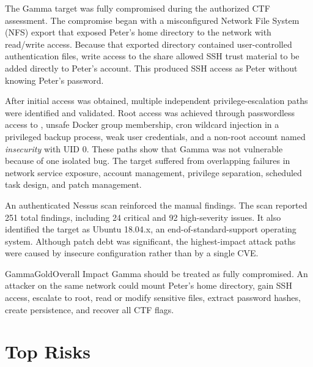 \documentclass[11pt,a4paper]{report}
\newcommand{\cmd}[1]{\texttt{\detokenize{#1}}}
\begin{document}
The Gamma target was fully compromised during the authorized CTF assessment. The compromise began with a misconfigured Network File System (NFS) export that exposed Peter's home directory to the network with read/write access. Because that exported directory contained user-controlled authentication files, write access to the share allowed SSH trust material to be added directly to Peter's account. This produced SSH access as Peter without knowing Peter's password.

After initial access was obtained, multiple independent privilege-escalation paths were identified and validated. Root access was achieved through passwordless \cmd{sudo} access to \cmd{/usr/bin/strace}, unsafe Docker group membership, cron wildcard injection in a privileged backup process, weak user credentials, and a non-root account named \textit{insecurity} with UID 0. These paths show that Gamma was not vulnerable because of one isolated bug. The target suffered from overlapping failures in network service exposure, account management, privilege separation, scheduled task design, and patch management.

An authenticated Nessus scan reinforced the manual findings. The scan reported 251 total findings, including 24 critical and 92 high-severity issues. It also identified the target as Ubuntu 18.04.x, an end-of-standard-support operating system. Although patch debt was significant, the highest-impact attack paths were caused by insecure configuration rather than by a single CVE.

\begin{findingbox}{GammaGold}{Overall Impact}
Gamma should be treated as fully compromised. An attacker on the same network could mount Peter's home directory, gain SSH access, escalate to root, read or modify sensitive files, extract password hashes, create persistence, and recover all CTF flags.
\end{findingbox}

\section*{Top Risks}
\end{document}
